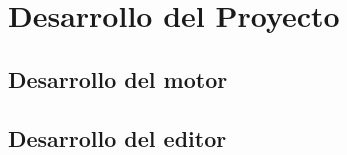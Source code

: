 \chapter{Desarrollo del Proyecto}
\label{cap:desarrollo}

\section{Desarrollo del motor}

\section{Desarrollo del editor}